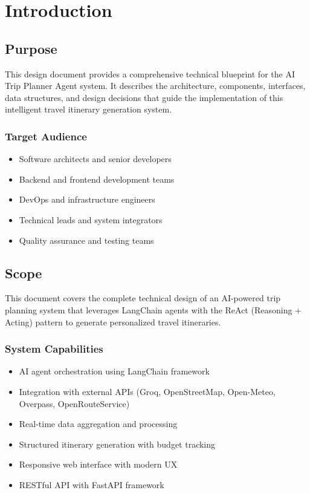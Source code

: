 \documentclass[12pt,a4paper]{report}
\begin{document}
\listoftables
\newpage

\chapter{Introduction}

\section{Purpose}

This design document provides a comprehensive technical blueprint for the AI Trip Planner Agent system. It describes the architecture, components, interfaces, data structures, and design decisions that guide the implementation of this intelligent travel itinerary generation system.

\subsection{Target Audience}

\begin{itemize}
    \item Software architects and senior developers
    \item Backend and frontend development teams
    \item DevOps and infrastructure engineers
    \item Technical leads and system integrators
    \item Quality assurance and testing teams
\end{itemize}

\section{Scope}

This document covers the complete technical design of an AI-powered trip planning system that leverages LangChain agents with the ReAct (Reasoning + Acting) pattern to generate personalized travel itineraries.

\subsection{System Capabilities}

\begin{itemize}
    \item AI agent orchestration using LangChain framework
    \item Integration with external APIs (Groq, OpenStreetMap, Open-Meteo, Overpass, OpenRouteService)
    \item Real-time data aggregation and processing
    \item Structured itinerary generation with budget tracking
    \item Responsive web interface with modern UX
    \item RESTful API with FastAPI framework
\end{itemize}
\end{document}
